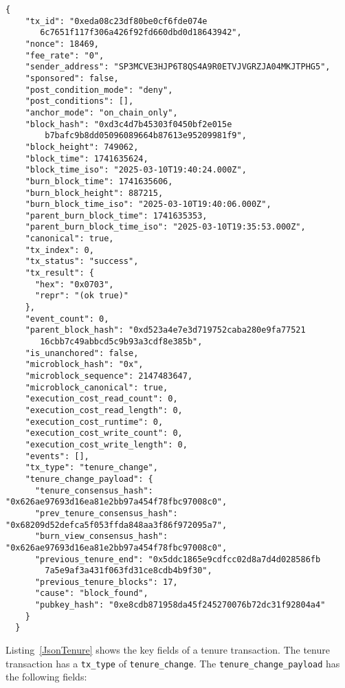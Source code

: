 \documentclass[12pt]{article}
\begin{document}
\begin{lstlisting}[label=transactionTenure,style=json, caption={Tenure transaction}]
  {
    "tx_id": "0xeda08c23df80be0cf6fde074e
       6c7651f117f306a426f92fd660dbd0d18643942",
    "nonce": 18469,
    "fee_rate": "0",
    "sender_address": "SP3MCVE3HJP6T8QS4A9R0ETVJVGRZJA04MKJTPHG5",
    "sponsored": false,
    "post_condition_mode": "deny",
    "post_conditions": [],
    "anchor_mode": "on_chain_only",
    "block_hash": "0xd3c4d7b45303f0450bf2e015e
        b7bafc9b8dd05096089664b87613e95209981f9",
    "block_height": 749062,
    "block_time": 1741635624,
    "block_time_iso": "2025-03-10T19:40:24.000Z",
    "burn_block_time": 1741635606,
    "burn_block_height": 887215,
    "burn_block_time_iso": "2025-03-10T19:40:06.000Z",
    "parent_burn_block_time": 1741635353,
    "parent_burn_block_time_iso": "2025-03-10T19:35:53.000Z",
    "canonical": true,
    "tx_index": 0,
    "tx_status": "success",
    "tx_result": {
      "hex": "0x0703",
      "repr": "(ok true)"
    },
    "event_count": 0,
    "parent_block_hash": "0xd523a4e7e3d719752caba280e9fa77521
       16cbb7c49abbcd5c9b93a3cdf8e385b",
    "is_unanchored": false,
    "microblock_hash": "0x",
    "microblock_sequence": 2147483647,
    "microblock_canonical": true,
    "execution_cost_read_count": 0,
    "execution_cost_read_length": 0,
    "execution_cost_runtime": 0,
    "execution_cost_write_count": 0,
    "execution_cost_write_length": 0,
    "events": [],
    "tx_type": "tenure_change",
    "tenure_change_payload": {
      "tenure_consensus_hash": "0x626ae97693d16ea81e2bb97a454f78fbc97008c0",
      "prev_tenure_consensus_hash": "0x68209d52defca5f053ffda848aa3f86f972095a7",
      "burn_view_consensus_hash": "0x626ae97693d16ea81e2bb97a454f78fbc97008c0",
      "previous_tenure_end": "0x5ddc1865e9cdfcc02d8a7d4d028586fb
        7a5e9af3a431f063fd31ce8cdb4b9f30",
      "previous_tenure_blocks": 17,
      "cause": "block_found",
      "pubkey_hash": "0xe8cdb871958da45f245270076b72dc31f92804a4"
    }
  }
\end{lstlisting}

%
%
\vspace{0.25in}
%
%

Listing~\ref{JsonTenure} shows the key fields of a tenure transaction.
The tenure transaction has a \lstinline|tx_type| of \lstinline|tenure_change|.
The \lstinline|tenure_change_payload| has the following fields:

%
%
\vspace{0.25in}
%
%
\end{document}
